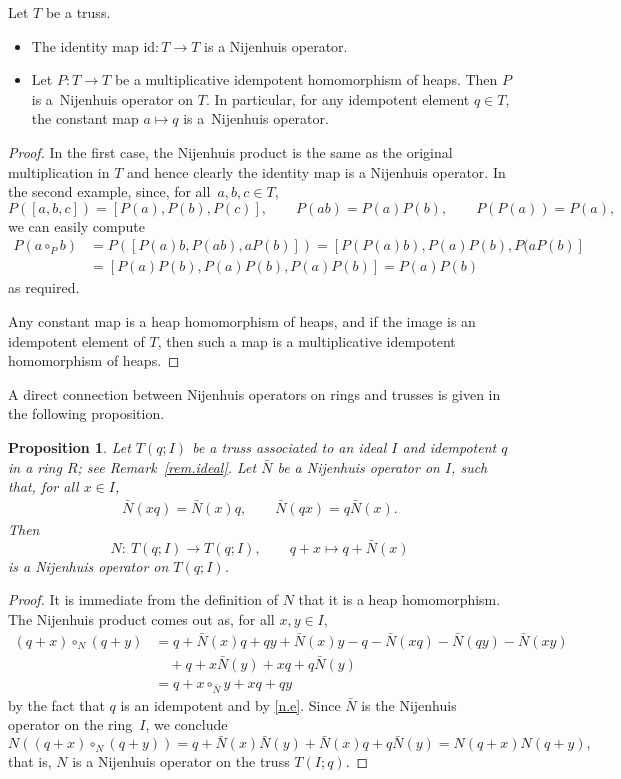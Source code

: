 \documentclass[pdftex]{sigma}
\numberwithin{equation}{section}
\newtheorem{Proposition}[Theorem]{Proposition}
 { \theoremstyle{definition}
\newtheorem{Definition}[Theorem]{Definition}
\newtheorem{Note}[Theorem]{Note}
\newtheorem{Example}[Theorem]{Example}
\newtheorem{Remark}[Theorem]{Remark}}
\newcommand{\id}{\mathrm{id}}
\begin{document}
\begin{Example}\label{ex.id.proj}
 Let $T$ be a truss.
 \begin{itemize}\itemsep=0pt
 \item[(1)] The identity map $\id\colon T\to T$ is a Nijenhuis operator.
 \item[(2)] Let $P\colon T\to T$ be a multiplicative idempotent homomorphism of heaps. Then $P$ is a~Nijenhuis operator on $T$. In particular, for any idempotent element $q\in T$, the constant map $a\mapsto q$ is a~Nijenhuis operator.
 \end{itemize}
\end{Example}
\begin{proof}
 In the first case, the Nijenhuis product is the same as the original multiplication in $T$ and hence clearly the identity map is a Nijenhuis operator. In the second example, since, for all~$a,b,c\in T$,
 \[
 P([a,b,c]) = [P(a), P(b), P(c)], \qquad P(ab) = P(a)P(b), \qquad P(P(a)) =P(a),
 \]
 we can easily compute
 \begin{align*}
 P(a\circ_Pb) &= P([P(a)b, P(ab),aP(b)]) = [P(P(a)b), P(a)P(b),P(aP(b)]\\
 &= [P(a)P(b), P(a)P(b),P(a)P(b)] = P(a)P(b)
 \end{align*}
 as required.

 Any constant map is a heap homomorphism of heaps, and if the image is an idempotent element of $T$, then such a map is a multiplicative idempotent homomorphism of heaps.
\end{proof}

A direct connection between Nijenhuis operators on rings and trusses is given in the following proposition.
\begin{Proposition}\label{prop.Nij.ideal}
 Let $T(q;I)$ be a truss associated to an ideal $I$ and idempotent $q$ in a ring $R$; see Remark~{\rm \ref{rem.ideal}}. Let $\bar{N}$ be a Nijenhuis operator on $I$, such that, for all $x\in I$,
 \begin{gather}\label{n.e}
 \bar{N}(xq) = \bar{N}(x)q, \qquad \bar{N}(qx) =q\bar{N}(x).
 \end{gather}
 Then
 \[
 N\colon\ T(q;I)\to T(q;I), \qquad q+x\mapsto q+ \bar{N}(x)
 \]
 is a Nijenhuis operator on $T(q;I)$.
\end{Proposition}
\begin{proof}
 It is immediate from the definition of $N$ that it is a heap homomorphism. The Nijenhuis product comes out as, for all $x,y\in I$,
 \begin{align*}
 (q+x)\circ_N(q+y) &= q +\bar{N}(x)q + qy +\bar{N}(x)y - q - \bar{N}(xq) - \bar{N}(qy) - \bar{N}(xy)\\
 & \quad+ q + x \bar{N}(y) + xq +q \bar{N}(y)\\
 &= q + x\circ_{\bar{N}}y +xq +qy
 \end{align*}
 by the fact that $q$ is an idempotent and by \eqref{n.e}. Since $\bar{N}$ is the Nijenhuis operator on the ring~$I$, we conclude
 \[
 N\left((q+x)\circ_N(q+y)\right) = q + \bar{N}(x)\bar{N}(y) + \bar{N}(x)q + q\bar{N}(y) = N(q+x)N(q+y),
 \]
that is, $N$ is a Nijenhuis operator on the truss $T(I;q)$.
\end{proof}
\end{document}
